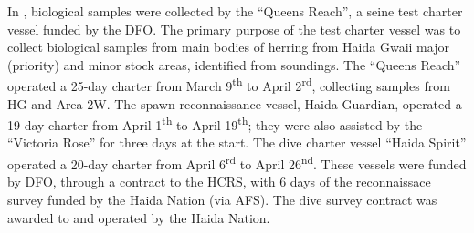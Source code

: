 In \thisYr{}, biological samples were collected by the ``Queens Reach'', a seine test charter vessel funded by the DFO.
The primary purpose of the test charter vessel was to collect biological samples from main bodies of herring from Haida Gwaii major (priority) and minor stock areas, identified from soundings.
The ``Queens Reach'' operated a 25-day charter from March 9\textsuperscript{th} to April 2\textsuperscript{rd}, collecting samples from HG and Area 2W.
The spawn reconnaissance vessel, Haida Guardian, operated a 19-day charter from April 1\textsuperscript{th} to April 19\textsuperscript{th}; they were also assisted by the ``Victoria Rose'' for three days at the start.
The dive charter vessel ``Haida Spirit'' operated a 20-day charter from April 6\textsuperscript{rd} to April 26\textsuperscript{nd}.
These vessels were funded by DFO, through a contract to the HCRS, with 6 days of the reconnaissace survey funded by the Haida Nation (via AFS).
The dive survey contract was awarded to and operated by the Haida Nation.